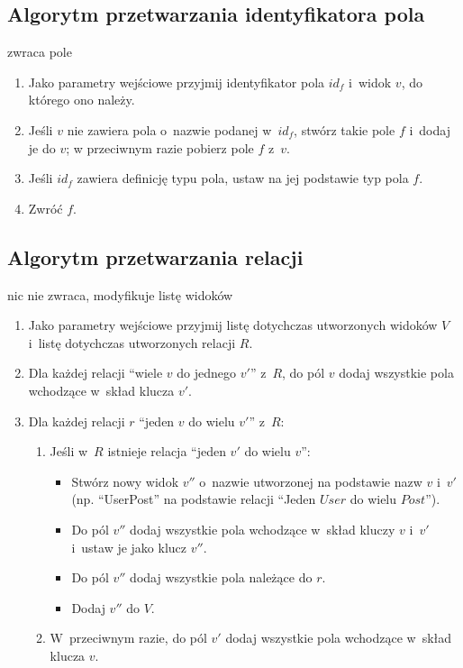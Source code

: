 \subsection{Algorytm przetwarzania identyfikatora pola} \label{sec:field_id_processing}

zwraca pole

\begin{enumerate}
 \item Jako parametry wejściowe przyjmij identyfikator pola $id_f$ i~widok $v$, do którego ono należy.
 \item Jeśli $v$ nie zawiera pola o~nazwie podanej w~$id_f$, stwórz takie pole $f$ i~dodaj je do $v$; w przeciwnym razie pobierz pole $f$ z~$v$.
 \item Jeśli $id_f$ zawiera definicję typu pola, ustaw na jej podstawie typ pola $f$.
 \item Zwróć $f$.
\end{enumerate}


\subsection{Algorytm przetwarzania relacji} \label{sec:relation_processing}

nic nie zwraca, modyfikuje listę widoków

\begin{enumerate}
 \item Jako parametry wejściowe przyjmij listę dotychczas utworzonych widoków $V$ i~listę dotychczas utworzonych relacji $R$.
 
 \item Dla każdej relacji ``wiele $v$ do jednego $v'$'' z~$R$, do pól $v$ dodaj wszystkie pola wchodzące w~skład klucza $v'$.
 
 \item Dla każdej relacji $r$ ``jeden $v$ do wielu $v'$'' z~$R$:
  \begin{enumerate}
   \item Jeśli w~$R$ istnieje relacja ``jeden $v'$ do wielu $v$'':
    \begin{itemize}
     \item Stwórz nowy widok $v''$ o~nazwie utworzonej na podstawie nazw $v$ i~$v'$ (np. ``UserPost'' na podstawie relacji ``Jeden $User$ do wielu $Post$'').
     \item Do pól $v''$ dodaj wszystkie pola wchodzące w~skład kluczy $v$ i~$v'$ i~ustaw je jako klucz $v''$.
     \item Do pól $v''$ dodaj wszystkie pola należące do $r$.
     \item Dodaj $v''$ do $V$.
    \end{itemize}
   \item W~przeciwnym razie, do pól $v'$ dodaj wszystkie pola wchodzące w~skład klucza $v$.
  \end{enumerate}
\end{enumerate}



